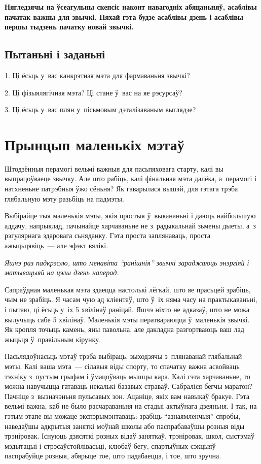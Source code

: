 \textbf{Нягледзячы на ўсеагульны скепсіс наконт навагодніх абяцаньняў, асаблівы пачатак важны для звычкі. Няхай гэта будзе асаблівы дзень і асаблівы першы тыдзень пачатку новай звычкі.}

\subsection*{Пытаньні і заданьні}

1. Ці ёсьць у~вас канкрэтная мэта для фармаваньня звычкі?

2. Ці фізыялягічная мэта? Ці стане ў~вас на яе рэсурсаў?

3. Ці ёсьць у~вас плян у~пісьмовым дэталізаваным выглядзе?


\section{Прынцып маленькіх мэтаў}

Штодзённыя перамогі вельмі важныя для пасьпяховага старту, калі вы выпрацоўваеце звычку. Але што рабіць, калі фінальная мэта далёка, а~перамогі і натхненьне патрэбныя ўжо сёньня? Як гаварылася вышэй, для гэтага трэба глябальную мэту разьбіць на падмэты.


Выбірайце тыя маленькія мэты, якія простыя ў~выкананьні і даюць найбольшую аддачу, напрыклад, пачынайце харчаваньне не з~радыкальнай зьмены дыеты, а~з рэгулярнага здаровага сьняданку. Гэта проста заплянаваць, проста ажыцьцявіць~--- але эфэкт вялікі.

\emph{Яшчэ раз падкрэслю, што менавіта ``ранішнія'' звычкі зараджаюць энэргіяй і матывацыяй на цэлы дзень наперад.}

Сапраўдная маленькая мэта здаецца настолькі лёгкай, што яе прасьцей зрабіць, чым не зрабіць. Я часам чую ад кліентаў, што ў~іх няма часу на практыкаваньні, і пытаю, ці ёсьць у~іх 5 хвілінаў раніцай. Яшчэ ніхто не адказаў, што не можа вылучыць сабе 5 хвілінаў. Маленькія мэты ператвараюцца ў~маленькія звычкі. Як кропля точыць камень, яны павольна, але дакладна разгортваюць ваш лад жыцьця ў~правільным кірунку.

Пасьлядоўнасьць мэтаў трэба выбіраць, зыходзячы з~плянаванай глябальнай мэты. Калі ваша мэта~--- сілавыя віды спорту, то спачатку важна асвойваць тэхніку з~пустым грыфам і ўмацоўваць мышцы кара. Калі гэта харчаваньне, то можна навучыцца гатаваць некалькі базавых страваў. Сабраліся бегчы маратон? Пачніце з~вызначэньня пульсавых зон. Ацаніце, якіх вам навыкаў бракуе. Гэта вельмі важна, каб не было расчараваньня на стадыі актыўнага дзеяньня. І так, на гэтым этапе вы можаце экспэрымэнтаваць: зрабіць ``азнаямленчыя'' спробы, наведаўшы адкрытыя заняткі моўнай школы або паспрабаваўшы розныя віды трэніровак. Існуюць дзясяткі розных відаў заняткаў, трэніровак, школ, сыстэмаў мэдытацыі і стрэсаўстойлівасьці, клюбаў бегу, спартыўных сэкцыяў~--- паспрабуйце розныя, абярыце тое, што падабаецца, і тое, што зручна.

